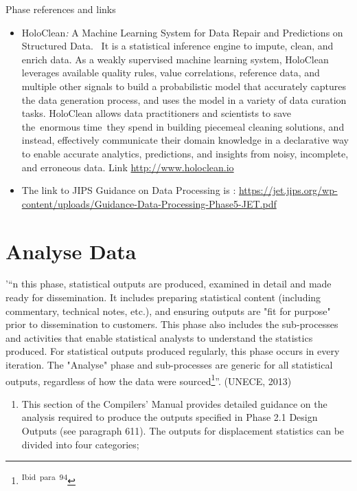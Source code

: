 \documentclass[
]{article}
\providecommand{\tightlist}{%
  \setlength{\itemsep}{0pt}\setlength{\parskip}{0pt}}
\begin{document}
Phase references and links

\begin{itemize}
\item
  HoloClean\emph{:} A Machine Learning System for Data Repair and
  Predictions on Structured Data. ~It is a statistical inference
  engine to impute, clean, and enrich data. As a weakly supervised
  machine learning system, HoloClean leverages available quality
  rules, value correlations, reference data, and multiple other
  signals to build a probabilistic model that accurately captures the
  data generation process, and uses the model in a variety of data
  curation tasks. HoloClean allows data practitioners and scientists
  to save the~enormous time~they spend in building piecemeal cleaning
  solutions, and instead, effectively communicate their domain
  knowledge in a declarative way to enable accurate analytics,
  predictions, and insights from noisy, incomplete, and erroneous
  data. Link \href{http://www.holoclean.io/}{http://www.holoclean.io}
\item
  The link to JIPS Guidance on Data Processing is : {}
  \url{https://jet.jips.org/wp-content/uploads/Guidance-Data-Processing-Phase5-JET.pdf}
\end{itemize}

\hypertarget{analyse-data-1}{%
\section{Analyse Data}\label{analyse-data-1}}

'``n this phase, statistical outputs are produced, examined in detail and
made ready for dissemination. It includes preparing statistical content
(including commentary, technical notes, etc.), and ensuring outputs are
"fit for purpose" prior to dissemination to customers. This phase also
includes the sub-processes and activities that enable statistical
analysts to understand the statistics produced. For statistical outputs
produced regularly, this phase occurs in every iteration. The
"Analyse" phase and sub-processes are generic for all statistical
outputs, regardless of how the data were sourced\footnote{\textsuperscript{Ibid~para~94}}''. (UNECE, 2013)

\begin{enumerate}
\def\labelenumi{\arabic{enumi}.}
\setcounter{enumi}{395}
\tightlist
\item
  This section of the Compilers' Manual provides detailed guidance on
  the analysis required to produce the outputs specified in Phase 2.1
  Design Outputs (see paragraph 611). The outputs for displacement
  statistics can be divided into four categories;
\end{enumerate}
\end{document}
